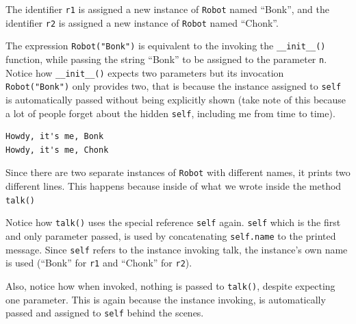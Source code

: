 The identifier \texttt{r1} is assigned a new instance of \texttt{Robot}
named ``Bonk'', and the identifier \texttt{r2} is assigned a new
instance of \texttt{Robot} named ``Chonk''.

The expression \texttt{Robot("Bonk")} is equivalent to the invoking the
\texttt{\_\_init\_\_()} function, while passing the string ``Bonk'' to
be assigned to the parameter \texttt{n}. Notice how
\texttt{\_\_init\_\_()} expects two parameters but its invocation
\texttt{Robot("Bonk")} only provides two, that is because the instance
assigned to \texttt{self} is automatically passed without being
explicitly shown (take note of this because a lot of people forget about
the hidden \texttt{self}, including me from time to time).

\begin{Shaded}
\begin{Highlighting}[]
\end{Highlighting}
\end{Shaded}

\begin{verbatim}
Howdy, it's me, Bonk
Howdy, it's me, Chonk
\end{verbatim}

Since there are two separate instances of \texttt{Robot} with different
names, it prints two different lines. This happens because inside of
what we wrote inside the method \texttt{talk()}

\begin{Shaded}
\begin{Highlighting}[]
\NormalTok{):}
    \NormalTok{(}\OperatorTok{+} 
\end{Highlighting}
\end{Shaded}

Notice how \texttt{talk()} uses the special reference \texttt{self}
again. \texttt{self} which is the first and only parameter passed, is
used by concatenating \texttt{self.name} to the printed message. Since
\texttt{self} refers to the instance invoking talk, the instance's own
name is used (``Bonk'' for \texttt{r1} and ``Chonk'' for \texttt{r2}).

Also, notice how when invoked, nothing is passed to \texttt{talk()},
despite expecting one parameter. This is again because the instance
invoking, is automatically passed and assigned to \texttt{self} behind
the scenes.

